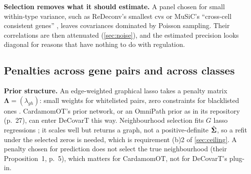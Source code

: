 \documentclass[11pt,a4paper]{article}
\begin{document}
\textbf{Selection removes what it should estimate.} A panel chosen for small within-type variance, such
as ReDeconv's smallest \glspl{cv} \parencite[p.~14]{luTranscriptomeSizeMatters2025} or MuSiC's
\enquote{cross-cell consistent genes} \parencite[p.~3]{wangBulkTissueCell2019}, leaves covariances
dominated by Poisson sampling. Their correlations are then attenuated (\cref{sec:noise}), and the
estimated precision looks diagonal for reasons that have nothing to do with regulation.

\subsection{Penalties across gene pairs and across classes}\label{sec:joint}

\textbf{Prior structure.} An edge-weighted graphical lasso takes a penalty matrix
$\bm\Lambda=(\lambda_{gh})$: small weights for whitelisted pairs, zero constraints for blacklisted ones
\parencite{friedmanSparseInverseCovariance2008}. CardamomOT's prior network, or an OmniPath prior as in
its repository (p.~27), can enter DeCovarT this way. Neighbourhood selection fits $G$ lasso regressions
\parencite{meinshausenHighdimensionalGraphsVariable2006}; it scales well but returns a
graph, not a positive-definite $\hat{\bm{\Sigma}}$, so a refit under the selected zeros is needed, which is
requirement (b)2 of \cref{sec:ceiling}. A penalty chosen for prediction does not select the true
neighbourhood (their Proposition~1, p.~5), which matters for CardamomOT, not for DeCovarT's plug-in.
\end{document}
